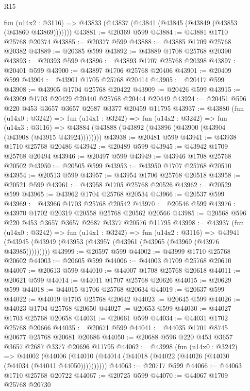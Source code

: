 \begin{lexlean}{R15}
\begin{coremodule}
    fun (u14x2 : @3116) => @43833 (@43837 (@43841 (@43845 (@43849 (@43853 (@43860 @43869)))))))
@43881 := @20369 @599
@43884 := @43881 @1710 @25768 @20374
@43885 := @20377 @599
@43888 := @43885 @1709 @25768 @20382
@43889 := @20385 @599
@43892 := @43889 @1708 @25768 @20390
@43893 := @20393 @599
@43896 := @43893 @1707 @25768 @20398
@43897 := @20401 @599
@43900 := @43897 @1706 @25768 @20406
@43901 := @20409 @599
@43904 := @43901 @1705 @25768 @20414
@43905 := @20417 @599
@43908 := @43905 @1704 @25768 @20422
@43909 := @20426 @599
@43915 := @43909 @1703 @20429 @20440 @25768 @20444 @20449
@43924 := @20451 @596 @220 @453 @3657 @3657 @2687 @3377 @20459 @11795
@43937 := @43880
    (fun (u14x0 : @3242) =>
    fun (u14x1 : @3242) =>
    fun (u14x2 : @3242) =>
    fun (u14x3 : @3116) =>
    @43884 (@43888 (@43892 (@43896 (@43900 (@43904 (@43908 (@43915 @43924))))))))
@43938 := @20481 @599
@43941 := @43938 @1710 @25768 @20486
@43942 := @20489 @599
@43945 := @43942 @1709 @25768 @20494
@43946 := @20497 @599
@43949 := @43946 @1708 @25768 @20502
@43950 := @20505 @599
@43953 := @43950 @1707 @25768 @20510
@43954 := @20513 @599
@43957 := @43954 @1706 @25768 @20518
@43958 := @20521 @599
@43961 := @43958 @1705 @25768 @20526
@43962 := @20529 @599
@43965 := @43962 @1704 @25768 @20534
@43966 := @20537 @599
@43969 := @43966 @1703 @25768 @20542
@43970 := @20546 @599
@43976 := @43970 @1702 @20319 @20558 @25768 @20562 @20566
@43985 := @20568 @596 @220 @453 @3657 @3657 @2687 @3377 @20576 @11795
@43998 := @43937
    (fun (u14x0 : @3242) =>
    fun (u14x1 : @3242) =>
    fun (u14x2 : @3116) =>
    @43941 (@43945 (@43949 (@43953 (@43957 (@43961 (@43965 (@43969 (@43976 @43985)))))))))
@43999 := @20597 @599
@44002 := @43999 @1710 @25768 @20602
@44003 := @20605 @599
@44006 := @44003 @1709 @25768 @20610
@44007 := @20613 @599
@44010 := @44007 @1708 @25768 @20618
@44011 := @20621 @599
@44014 := @44011 @1707 @25768 @20626
@44015 := @20629 @599
@44018 := @44015 @1706 @25768 @20634
@44019 := @20637 @599
@44022 := @44019 @1705 @25768 @20642
@44023 := @20645 @599
@44026 := @44023 @1704 @25768 @20650
@44027 := @20653 @599
@44030 := @44027 @1703 @25768 @20658
@44031 := @20661 @599
@44034 := @44031 @1702 @25768 @20666
@44035 := @20671 @599
@44041 := @44035 @1701 @8745 @20677 @25768 @20681 @20686
@44050 := @20688 @596 @220 @453 @3657 @3657 @2687 @3377 @20696 @11795
@44062 := @43998
    (fun (u14x0 : @3242) =>
    @44002 (@44006 (@44010 (@44014 (@44018 (@44022 (@44026 (@44030 (@44034 (@44041 @44050))))))))))
@44063 := @20717 @599
@44066 := @44063 @1710 @25768 @20722
@44067 := @20725 @599
@44070 := @44067 @1709 @25768 @20730

\end{coremodule}
\end{lexlean}
